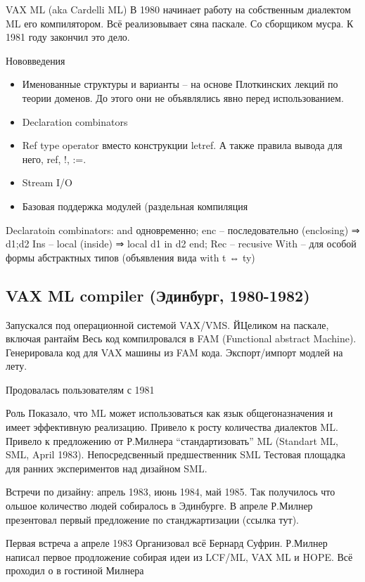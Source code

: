 \documentclass[14pt]{matmex-diploma-custom}
\begin{document}
\begin{itemize}
\begin{itemize}
VAX ML (aka Cardelli ML)
В 1980 начинает работу на собственным диалектом ML его компилятором. Всё реализовывает сяна паскале. Со сборщиком мусра. К 1981 году закончил это дело.

Нововведения
\begin{itemize}
 \item Именованные структуры и варианты -- на основе Плоткинских лекций по теории доменов.  До этого они не объявлялись явно перед использованием.
\item Declaration combinators
\item Ref type operator вместо конструкции letref. А также правила вывода для него, ref, !, :=.
\item Stream I/O
\item Базовая поддержка модулей (раздельная компиляция

\end{itemize}


Declaratoin combinators:
and одновременно;
enc -- последовательно (enclosing)  ⇒ d1;d2
Ins -- local (inside) ⇒ local d1 in d2 end;
Rec -- recusive
With -- для особой формы абстрактных типов (объявления вида with t ⇔ ty)

\subsection{VAX ML compiler (Эдинбург, 1980-1982)}
Запускался под операционной системой VAX/VMS.
ЙЦеликом на паскале, включая рантайм
Весь код компилровался в FAM (Functional abstract Machine).
Генерировала код для VAX машины из FAM кода.
Экспорт/импорт модлей на лету.

Продовалась пользователям с 1981

Роль
Показало, что ML может использоваться как язык общегоназначения и имеет эффективную реализацию. 
Привело к росту количества диалектов ML. Привело к предложению от Р.Милнера “стандартизовать” ML (Standart ML, SML, April 1983).
Непосредсвенный предшественник SML
Тестовая площадка для ранних экспериментов над дизайном SML.

 Встречи по дизайну: апрель 1983, июнь 1984, май 1985. Так получилось что ольшое количество людей собиралось в Эдинбурге. В апреле Р.Милнер презентовал первый предложение по станджартизации (ссылка тут). 

Первая встреча а апреле 1983
Организовал всё Бернард Суфрин. Р.Милнер написал первое продложение  собирая идеи из LCF/ML, VAX ML и HOPE. Всё проходил о в гостиной Милнера


\end{itemize}
\end{itemize}
\end{document}
